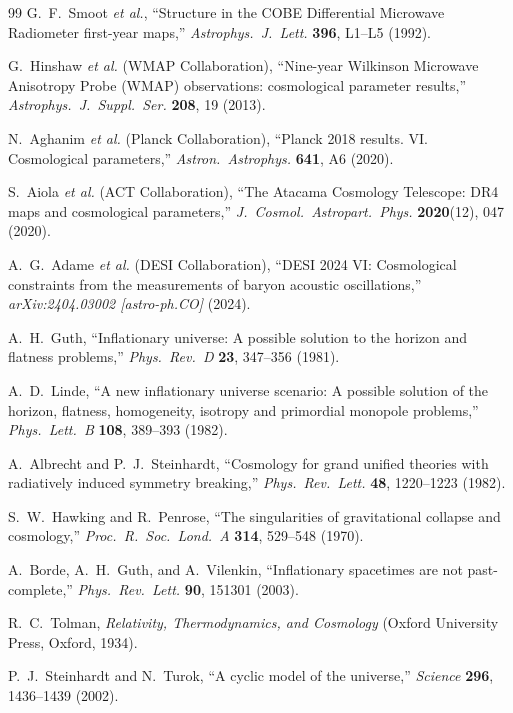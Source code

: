\documentclass[11pt,a4paper]{article}
\theoremstyle{plain}
\theoremstyle{definition}
\theoremstyle{remark}
\numberwithin{equation}{section}
\begin{document}
\begin{thebibliography}{99}
G.~F.~Smoot \textit{et al.}, ``Structure in the COBE Differential Microwave Radiometer first-year maps,'' \textit{Astrophys.\ J.\ Lett.} \textbf{396}, L1--L5 (1992).

G.~Hinshaw \textit{et al.} (WMAP Collaboration), ``Nine-year Wilkinson Microwave Anisotropy Probe (WMAP) observations: cosmological parameter results,'' \textit{Astrophys.\ J.\ Suppl.\ Ser.} \textbf{208}, 19 (2013).

N.~Aghanim \textit{et al.} (Planck Collaboration), ``Planck 2018 results. VI. Cosmological parameters,'' \textit{Astron.\ Astrophys.} \textbf{641}, A6 (2020).

S.~Aiola \textit{et al.} (ACT Collaboration), ``The Atacama Cosmology Telescope: DR4 maps and cosmological parameters,'' \textit{J.\ Cosmol.\ Astropart.\ Phys.} \textbf{2020}(12), 047 (2020).

A.~G.~Adame \textit{et al.} (DESI Collaboration), ``DESI 2024 VI: Cosmological constraints from the measurements of baryon acoustic oscillations,'' \textit{arXiv:2404.03002 [astro-ph.CO]} (2024).

A.~H.~Guth, ``Inflationary universe: A possible solution to the horizon and flatness problems,'' \textit{Phys.\ Rev.\ D} \textbf{23}, 347--356 (1981).

A.~D.~Linde, ``A new inflationary universe scenario: A possible solution of the horizon, flatness, homogeneity, isotropy and primordial monopole problems,'' \textit{Phys.\ Lett.\ B} \textbf{108}, 389--393 (1982).

A.~Albrecht and P.~J.~Steinhardt, ``Cosmology for grand unified theories with radiatively induced symmetry breaking,'' \textit{Phys.\ Rev.\ Lett.} \textbf{48}, 1220--1223 (1982).

S.~W.~Hawking and R.~Penrose, ``The singularities of gravitational collapse and cosmology,'' \textit{Proc.\ R.\ Soc.\ Lond.\ A} \textbf{314}, 529--548 (1970).

A.~Borde, A.~H.~Guth, and A.~Vilenkin, ``Inflationary spacetimes are not past-complete,'' \textit{Phys.\ Rev.\ Lett.} \textbf{90}, 151301 (2003).

R.~C.~Tolman, \textit{Relativity, Thermodynamics, and Cosmology} (Oxford University Press, Oxford, 1934).

P.~J.~Steinhardt and N.~Turok, ``A cyclic model of the universe,'' \textit{Science} \textbf{296}, 1436--1439 (2002).


\end{thebibliography}
\end{document}
